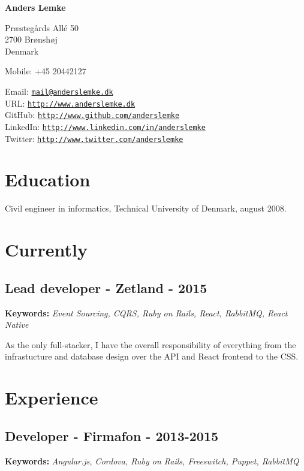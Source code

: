 \documentclass[a4paper]{article}
\newcommand{\keywords}[1]{\small\textbf{Keywords:} \emph{#1}\normalsize}
\begin{document}
{\huge\bf Anders Lemke}

\bigskip
Præstegårds Allé 50 \\
2700 Brønshøj \\
Denmark

\medskip

Mobile: +45 20442127

\medskip

Email: \href{mailto:mail@anderslemke.dk}{\tt mail@anderslemke.dk} \\
URL: \href{http://www.anderslemke.dk}{\tt http://www.anderslemke.dk} \\
GitHub: \href{http://www.github.com/anderslemke}{\tt http://www.github.com/anderslemke} \\
LinkedIn: \href{http://www.linkedin.com/in/anderslemke}{\tt http://www.linkedin.com/in/anderslemke} \\
Twitter: \href{http://www.twitter.com/anderslemke}{\tt http://www.twitter.com/anderslemke} 

\section*{Education}
Civil engineer in informatics, Technical University of Denmark, august 2008.

\section*{Currently}

\subsection*{Lead developer - Zetland - 2015}
\keywords{Event Sourcing, CQRS, Ruby on Rails, React, RabbitMQ, React Native}

As the only full-stacker, I have the overall responsibility of everything from the infrastucture and database design over the API and React frontend to the CSS.

\section*{Experience}

\subsection*{Developer - Firmafon - 2013-2015}
\keywords{Angular.js, Cordova, Ruby on Rails, Freeswitch, Puppet, RabbitMQ}
\end{document}
